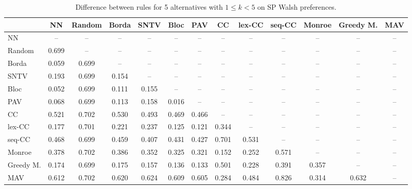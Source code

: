 
\begin{table*}[htbp]
\centering
\begin{tabular}{lcccccccccccc}
\toprule
 & NN & Random & Borda & SNTV & Bloc & PAV & CC & lex-CC & seq-CC & Monroe & Greedy M. & MAV \\
\midrule
NN & -- & -- & -- & -- & -- & -- & -- & -- & -- & -- & -- & -- \\
Random & \cellcolor{blue!69} 0.699 & -- & -- & -- & -- & -- & -- & -- & -- & -- & -- & -- \\
Borda & \cellcolor{blue!5} 0.059 & \cellcolor{blue!69} 0.699 & -- & -- & -- & -- & -- & -- & -- & -- & -- & -- \\
SNTV & \cellcolor{blue!19} 0.193 & \cellcolor{blue!69} 0.699 & \cellcolor{blue!15} 0.154 & -- & -- & -- & -- & -- & -- & -- & -- & -- \\
Bloc & \cellcolor{blue!5} 0.052 & \cellcolor{blue!69} 0.699 & \cellcolor{blue!11} 0.111 & \cellcolor{blue!15} 0.155 & -- & -- & -- & -- & -- & -- & -- & -- \\
PAV & \cellcolor{blue!6} 0.068 & \cellcolor{blue!69} 0.699 & \cellcolor{blue!11} 0.113 & \cellcolor{blue!15} 0.158 & \cellcolor{blue!1} 0.016 & -- & -- & -- & -- & -- & -- & -- \\
CC & \cellcolor{blue!52} 0.521 & \cellcolor{blue!70} 0.702 & \cellcolor{blue!53} 0.530 & \cellcolor{blue!49} 0.493 & \cellcolor{blue!46} 0.469 & \cellcolor{blue!46} 0.466 & -- & -- & -- & -- & -- & -- \\
lex-CC & \cellcolor{blue!17} 0.177 & \cellcolor{blue!70} 0.701 & \cellcolor{blue!22} 0.221 & \cellcolor{blue!23} 0.237 & \cellcolor{blue!12} 0.125 & \cellcolor{blue!12} 0.121 & \cellcolor{blue!34} 0.344 & -- & -- & -- & -- & -- \\
seq-CC & \cellcolor{blue!46} 0.468 & \cellcolor{blue!69} 0.699 & \cellcolor{blue!45} 0.459 & \cellcolor{blue!40} 0.407 & \cellcolor{blue!43} 0.431 & \cellcolor{blue!42} 0.427 & \cellcolor{blue!70} 0.701 & \cellcolor{blue!53} 0.531 & -- & -- & -- & -- \\
Monroe & \cellcolor{blue!37} 0.378 & \cellcolor{blue!70} 0.702 & \cellcolor{blue!38} 0.386 & \cellcolor{blue!35} 0.352 & \cellcolor{blue!32} 0.325 & \cellcolor{blue!32} 0.321 & \cellcolor{blue!15} 0.152 & \cellcolor{blue!25} 0.252 & \cellcolor{blue!57} 0.571 & -- & -- & -- \\
Greedy M. & \cellcolor{blue!17} 0.174 & \cellcolor{blue!69} 0.699 & \cellcolor{blue!17} 0.175 & \cellcolor{blue!15} 0.157 & \cellcolor{blue!13} 0.136 & \cellcolor{blue!13} 0.133 & \cellcolor{blue!50} 0.501 & \cellcolor{blue!22} 0.228 & \cellcolor{blue!39} 0.391 & \cellcolor{blue!35} 0.357 & -- & -- \\
MAV & \cellcolor{blue!61} 0.612 & \cellcolor{blue!70} 0.702 & \cellcolor{blue!62} 0.620 & \cellcolor{blue!62} 0.624 & \cellcolor{blue!60} 0.609 & \cellcolor{blue!60} 0.605 & \cellcolor{blue!28} 0.284 & \cellcolor{blue!48} 0.484 & \cellcolor{blue!82} 0.826 & \cellcolor{blue!31} 0.314 & \cellcolor{blue!63} 0.632 & -- \\
\bottomrule
\end{tabular}

\caption{Difference between rules for 5 alternatives with $1 \leq k < 5$ on SP Walsh preferences.}
\label{tab:rule_distance_heatmap-m=[5]-pref_dist=single_peaked_walsh}
\end{table*}
    